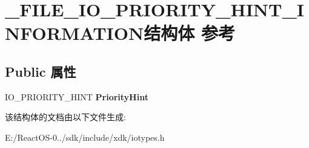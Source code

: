 \hypertarget{struct___f_i_l_e___i_o___p_r_i_o_r_i_t_y___h_i_n_t___i_n_f_o_r_m_a_t_i_o_n}{}\section{\+\_\+\+F\+I\+L\+E\+\_\+\+I\+O\+\_\+\+P\+R\+I\+O\+R\+I\+T\+Y\+\_\+\+H\+I\+N\+T\+\_\+\+I\+N\+F\+O\+R\+M\+A\+T\+I\+O\+N结构体 参考}
\label{struct___f_i_l_e___i_o___p_r_i_o_r_i_t_y___h_i_n_t___i_n_f_o_r_m_a_t_i_o_n}
\subsection*{Public 属性}
\begin{DoxyCompactItemize}
\item 
\mbox{\label{struct___f_i_l_e___i_o___p_r_i_o_r_i_t_y___h_i_n_t___i_n_f_o_r_m_a_t_i_o_n_ac2ad7e4bc9a6b1fca33c55d6cbce7359}} 
I\+O\+\_\+\+P\+R\+I\+O\+R\+I\+T\+Y\+\_\+\+H\+I\+NT {\bfseries Priority\+Hint}
\end{DoxyCompactItemize}


该结构体的文档由以下文件生成\+:\begin{DoxyCompactItemize}
\item 
E\+:/\+React\+O\+S-\/0../sdk/include/xdk/iotypes.\+h\end{DoxyCompactItemize}
